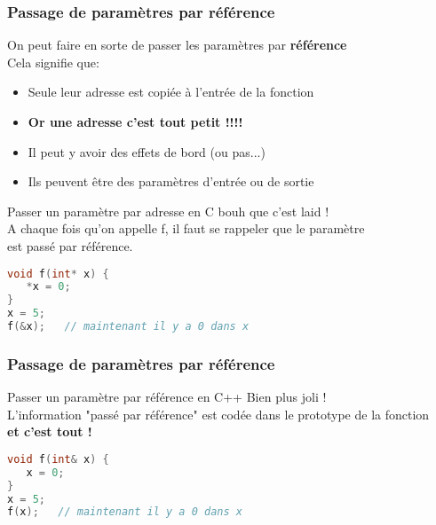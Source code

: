 \documentclass{beamer}
\begin{document}
\begin{frame}[fragile=singleslide,shrink=20]
\frametitle{Passage de paramètres par référence}
On peut faire en sorte de passer les paramètres par \textbf{référence} \\
Cela signifie que:
\begin{itemize}
\item{Seule leur adresse est copiée à l'entrée de la fonction}
\item{\textbf{Or une adresse c'est tout petit !!!!}}
\item{Il peut y avoir des effets de bord (ou pas...)}
\item{Ils peuvent être des paramètres d'entrée ou de sortie}
\end{itemize}

\begin{block}{Passer un paramètre par adresse en C}
bouh que c'est laid ! \\
A chaque fois qu'on appelle f, il faut se rappeler que le paramètre \\
est passé par référence.
\begin{lstlisting}[language=c++]
void f(int* x) {
   *x = 0;
}
x = 5;
f(&x);   // maintenant il y a 0 dans x
\end{lstlisting}
\end{block}
\end{frame}

\begin{frame}[fragile=singleslide,shrink=20]
\frametitle{Passage de paramètres par référence}
\begin{block}{Passer un paramètre par référence en C++}
Bien plus joli ! \\
L'information "passé par référence" est codée dans le prototype de la fonction \\
\textbf{et c'est tout !}
\begin{lstlisting}[language=c++]
void f(int& x) {
   x = 0;
}
x = 5;
f(x);   // maintenant il y a 0 dans x
\end{lstlisting}
\end{block}
\end{frame}
\end{document}
